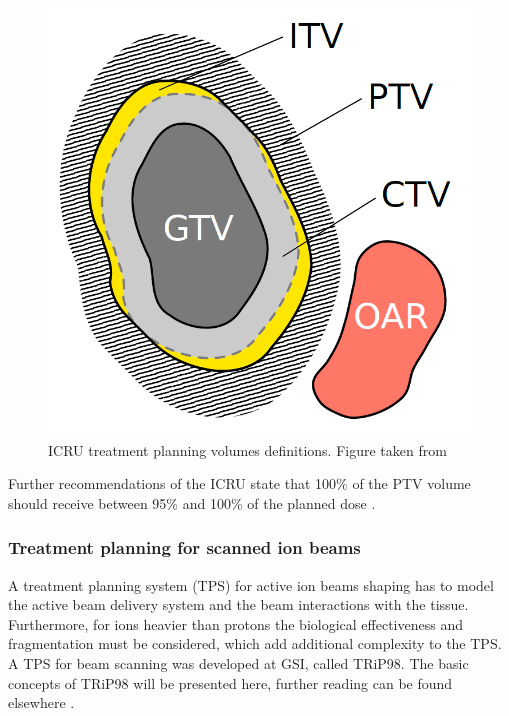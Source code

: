\begin{figure}[H]
\begin{center}
\includegraphics[scale=0.3]{./Fundamentals/Images/volumes.png}
\caption{ICRU treatment planning volumes definitions. Figure taken from \cite{Richter2012}}
\label{targets}
\end{center}
\end{figure}

Further recommendations of the ICRU state that 100\% of the PTV volume should receive between 95\% and 100\% of the planned dose \cite{ICRU50}.


\subsubsection{Treatment planning for scanned ion beams}

A treatment planning system (TPS) for active ion beams shaping has to model the active beam delivery system and the beam interactions with the tissue. Furthermore, for ions heavier than protons
the biological effectiveness and fragmentation must be considered, which add additional complexity to the TPS. A TPS for beam scanning was developed at GSI, called TRiP98. The basic concepts of TRiP98 will be
presented here, further reading can be found elsewhere \cite{Kraemer2000,Kraemer2000a, Richter2013}.

